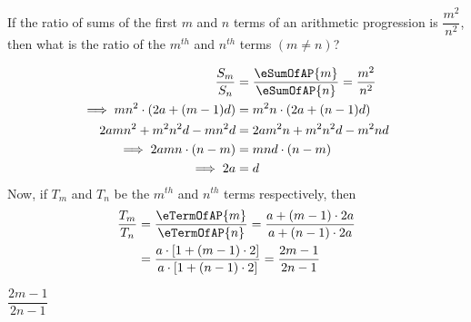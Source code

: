 

\question[3] If the ratio of sums of the first $m$ and $n$ terms of an 
arithmetic progression is $\dfrac{m^2}{n^2}$, then what is the ratio 
of the $m^{th}$ and $n^{th}$ terms $(m\neq n)$?

\begin{solution}[\halfpage]
	\begin{align}
		\dfrac{S_m}{S_n} &= \dfrac{\eSumOfAP{m}}{\eSumOfAP{n}} = \dfrac{m^2}{n^2} \\
		\implies mn^2\cdot(2a + (m-1)d) &= m^2n\cdot(2a + (n-1)d) \\
		2amn^2 + m^2n^2d - mn^2d &= 2am^2n + m^2n^2d - m^2nd \\
		\implies 2amn\cdot(n-m) &= mnd\cdot(n-m) \\
		\implies 2a &= d 
	\end{align}
	Now, if $T_m$ and $T_n$ be the $m^{th}$ and $n^{th}$ terms respectively, then 
	\begin{align}
		\dfrac{T_m}{T_n} &= \dfrac{\eTermOfAP{m}}{\eTermOfAP{n}} = \dfrac{a + (m-1)\cdot 2a}{a + (n-1)\cdot 2a}\\
		&= \dfrac{a\cdot\left[1 + (m-1)\cdot 2\right]}{a\cdot\left[1 + (n-1)\cdot 2\right]} 
		= \dfrac{2m-1}{2n-1}
	\end{align}
\end{solution}
\ifprintanswers\begin{codex}$\dfrac{2m-1}{2n-1}$\end{codex}\fi
